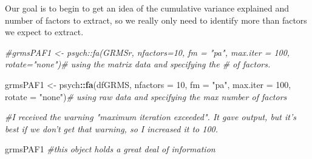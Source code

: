 \documentclass[
  english,
]{book}
\newenvironment{Shaded}{\begin{snugshade}}{\end{snugshade}}
\newcommand{\CommentTok}[1]{\textcolor[rgb]{0.56,0.35,0.01}{\textit{#1}}}
\newcommand{\DataTypeTok}[1]{\textcolor[rgb]{0.13,0.29,0.53}{#1}}
\newcommand{\DecValTok}[1]{\textcolor[rgb]{0.00,0.00,0.81}{#1}}
\newcommand{\KeywordTok}[1]{\textcolor[rgb]{0.13,0.29,0.53}{\textbf{#1}}}
\newcommand{\NormalTok}[1]{#1}
\newcommand{\OperatorTok}[1]{\textcolor[rgb]{0.81,0.36,0.00}{\textbf{#1}}}
\newcommand{\StringTok}[1]{\textcolor[rgb]{0.31,0.60,0.02}{#1}}
\begin{document}
Our goal is to begin to get an idea of the cumulative variance explained and number of factors to extract, so we really only need to identify more than factors we expect to extract.

\begin{Shaded}
\begin{Highlighting}[]
\CommentTok{#grmsPAF1 <- psych::fa(GRMSr, nfactors=10, fm = "pa", max.iter = 100, rotate="none")# using the matrix data and specifying the # of factors.}

\NormalTok{grmsPAF1 <-}\StringTok{ }\NormalTok{psych}\OperatorTok{::}\KeywordTok{fa}\NormalTok{(dfGRMS, }\DataTypeTok{nfactors =} \DecValTok{10}\NormalTok{, }\DataTypeTok{fm =} \StringTok{"pa"}\NormalTok{, }\DataTypeTok{max.iter =} \DecValTok{100}\NormalTok{, }\DataTypeTok{rotate =} \StringTok{"none"}\NormalTok{)}\CommentTok{# using raw data and specifying the max number of factors}

\CommentTok{#I received the warning "maximum iteration exceeded". It gave output, but it's best if we don't get that warning, so I increased it to 100. }

\NormalTok{grmsPAF1 }\CommentTok{#this object holds a great deal of information }
\end{Highlighting}
\end{Shaded}
\end{document}
